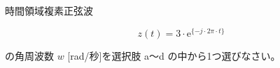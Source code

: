 時間領域複素正弦波

\[
z(t) =  3 \cdot \textrm{e}^{\{ -j \cdot 2\pi \cdot t \}}
\]

\bigskip
\noindent の角周波数 $w$ [rad/秒]を選択肢 a〜d の中から1つ選びなさい。
